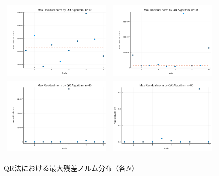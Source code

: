 \documentclass[a4paper,11pt]{ltjsarticle}
\begin{document}
\begin{figure}[H]
  \centering
  \begin{tabular}{cc}
    \includegraphics[width=72mm]{graphs/exp5_n10_max_residual.png} &
    \includegraphics[width=72mm]{graphs/exp5_n20_max_residual.png} \\
    \includegraphics[width=72mm]{graphs/exp5_n40_max_residual.png} &
    \includegraphics[width=72mm]{graphs/exp5_n80_max_residual.png} \\
  \end{tabular}
  \caption{QR法における最大残差ノルム分布（各$N$）}
  \label{fig:exp5_residuals}
\end{figure}
\end{document}
